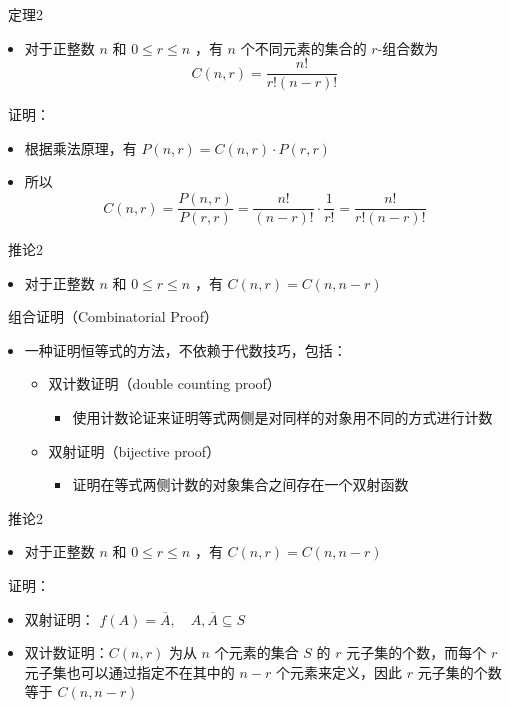 \documentclass[UTF8]{report}
\theoremstyle{MyLineTheoremStyle} %
\theoremstyle{MyBlockTheoremStyle} %
\theoremstyle{MySubsubsectionStyle} %
\begin{document}
\textbullet\ 定理2
\begin{itemize}
    \item 对于正整数 $n$ 和 $0 \leq r \leq n$ ，有 $n$ 个不同元素的集合的 $r$-组合数为
    \[
    C(n, r) = \frac{n!}{r! (n - r)!}
    \]
\end{itemize}

\textbullet\ 证明：
\begin{itemize}
    \item 根据乘法原理，有 $P(n, r) = C(n, r) \cdot P(r, r)$
    \item 所以
    \[
    C(n, r) = \frac{P(n,r)}{P(r,r)} = \frac{n!}{(n-r)!} \cdot \frac{1}{r!} = \frac{n!}{r! (n-r)!}
    \]
\end{itemize}

\textbullet\ 推论2
\begin{itemize}
    \item 对于正整数 $n$ 和 $0 \leq r \leq n$ ，有 $C(n, r) = C(n, n - r)$
\end{itemize}

\textbullet\ 组合证明（Combinatorial Proof）
\begin{itemize}
    \item 一种证明恒等式的方法，不依赖于代数技巧，包括：
    \begin{itemize}
        \item 双计数证明（double counting proof）
        \begin{itemize}
            \item 使用计数论证来证明等式两侧是对同样的对象用不同的方式进行计数
        \end{itemize}
        \item 双射证明（bijective proof）
        \begin{itemize}
            \item 证明在等式两侧计数的对象集合之间存在一个双射函数
        \end{itemize}
    \end{itemize}
\end{itemize}

\textbullet\ 推论2
\begin{itemize}
    \item 对于正整数 $n$ 和 $0 \leq r \leq n$ ，有 $C(n, r) = C(n, n - r)$
\end{itemize}

\textbullet\ 证明：
\begin{itemize}
    \item 双射证明： $f(A) = \overline{A} , \quad A,\overline{A} \subseteq S$
    \item 双计数证明：$C(n, r)$ 为从 $n$ 个元素的集合 $S$ 的 $r$ 元子集的个数，而每个 $r$ 元子集也可以通过指定不在其中的 $n - r$ 个元素来定义，因此 $r$ 元子集的个数等于 $C(n, n - r)$
\end{itemize}
\end{document}
